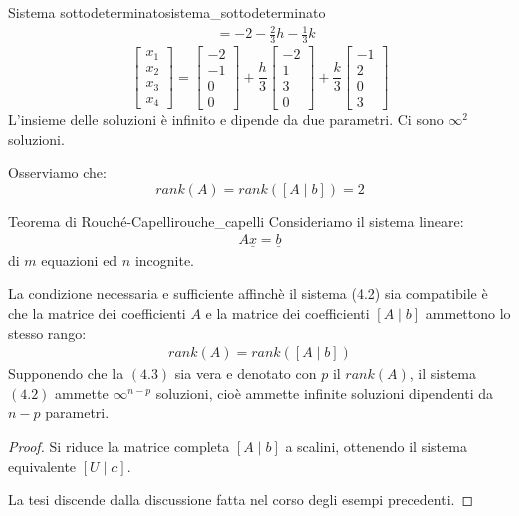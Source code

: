 \documentclass[12pt]{report}
\newcounter{theorem}
\newcommand{\nmu}{}
\begin{document}
\begin{example}{\nmu Sistema sottodeterminato}{sistema_sottodeterminato}
\begin{align*}
&= -2 - \frac{2}{3}h - \frac{1}{3}k
\end{align*}
\[
\begin{bmatrix}
	x_1 \\
	x_2 \\
	x_3 \\
	x_4
\end{bmatrix} = \begin{bmatrix}
	-2 \\
	-1 \\
	0 \\
	0
\end{bmatrix} + \frac{h}{3}\begin{bmatrix}
	-2 \\
	1 \\
	3 \\
	0
\end{bmatrix} + \frac{k}{3}\begin{bmatrix}
	-1 \\
	2 \\
	0 \\
	3
\end{bmatrix}
\]
L'insieme delle soluzioni è infinito e dipende da due parametri. Ci sono $\infty^2$ soluzioni.

Osserviamo che:
\[
rank(A) = rank([A\mid b]) = 2
\]
\end{example}
\begin{theorem}{\nmu Teorema di Rouché-Capelli}{rouche_capelli}
	Consideriamo il sistema lineare:
	\begin{align}
	A\underline{x} = \underline{b}
	\end{align}
	di $m$ equazioni ed $n$ incognite.

	La condizione necessaria e sufficiente affinchè il sistema (4.2) sia compatibile è che la matrice dei coefficienti $A$ e la matrice dei coefficienti $[A \mid b]$ ammettono lo stesso rango:
	\begin{align}
	rank(A) = rank([A\mid b])
	\end{align}
	Supponendo che la $(4.3)$ sia vera e denotato con $p$ il $rank(A)$, il sistema $(4.2)$ ammette $\infty^{n-p}$ soluzioni, cioè ammette infinite soluzioni dipendenti da $n-p$ parametri.
\end{theorem}
\begin{proof} Si riduce la matrice completa $[A\mid b]$ a scalini, ottenendo il sistema equivalente $[U \mid c]$.

La tesi discende dalla discussione fatta nel corso degli esempi precedenti.
\end{proof}
\end{document}
